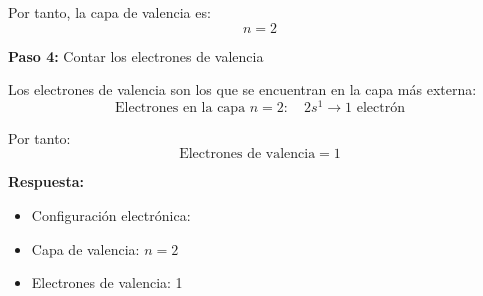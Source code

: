 \begin{exercise}
\begin{solu}
        Por tanto, la capa de valencia es:
        \[
            \boxed{n = 2}
        \]

        \textbf{Paso 4:} Contar los electrones de valencia

        Los electrones de valencia son los que se encuentran en la capa más externa:
        \[
            \text{Electrones en la capa } n = 2: \quad 2s^1 \rightarrow 1 \text{ electrón}
        \]

        Por tanto:
        \[
            \boxed{\text{Electrones de valencia} = 1}
        \]

        \textbf{Respuesta:}
        \begin{itemize}
            \item Configuración electrónica: 
            \item Capa de valencia: \(n = 2\)
            \item Electrones de valencia: 1
        \end{itemize}
    \end{solu}
\end{exercise}
